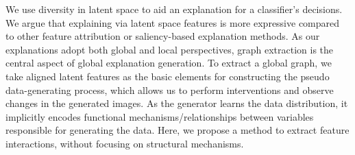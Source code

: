 \documentclass{article}
\newtheorem{prp}{Proposition}
\begin{document}
We use diversity in latent space to aid an explanation for a classifier's decisions.
We argue that explaining via latent space features is more expressive compared to other feature attribution or saliency-based explanation methods.
As our explanations adopt both global and local perspectives, graph extraction is the central aspect of global explanation generation.
To extract a global graph, we take aligned latent features as the basic elements for constructing the pseudo data-generating process, which allows us to perform interventions and observe changes in the generated images.
As the generator learns the data distribution, it implicitly encodes functional mechanisms/relationships between variables responsible for generating the data.  
Here, we propose a method to extract feature interactions, without focusing on structural mechanisms.


\end{document}
